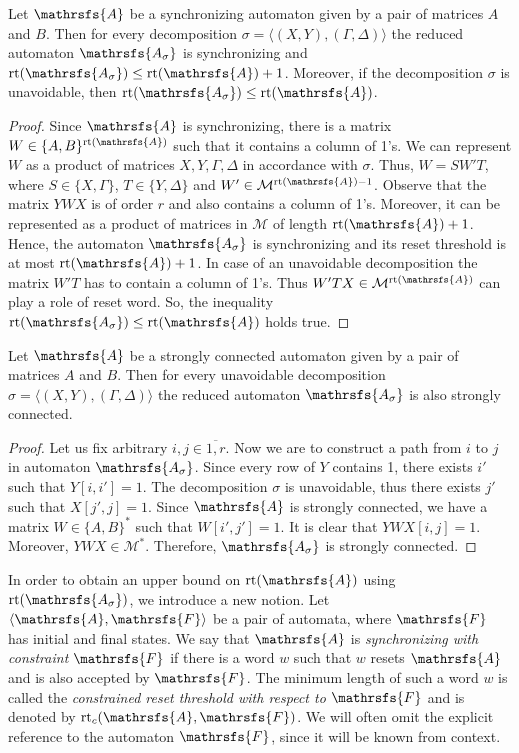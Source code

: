 \documentclass[11pt]{llncs}
\newcommand{\A}{\mathrsfs{A}}
\newcommand{\AD}{\mathrsfs{A_{\sigma}}}
\newcommand{\G}{\Gamma}
\newcommand{\D}{\Delta}
\newcommand{\rt}{\mathrm{rt}}
\newcommand{\rtc}{\mathrm{rt}_{c}}
\begin{document}
\begin{proposition}
\label{th:1} Let $\A$ be a synchronizing automaton given by a pair of matrices $A$ and $B$. Then for every decomposition $\sigma =
\langle(X,Y), (\G,\D)\rangle$ the reduced automaton $\AD$ is synchronizing and $\rt(\AD) \leq \rt(\A) + 1$. Moreover, if the decomposition
$\sigma$ is unavoidable, then $\rt(\AD) \leq \rt(\A)$.
\end{proposition}

\begin{proof}
Since $\A$ is synchronizing, there is a matrix $W \in \{A, B\}^{\rt(\A)}$ such that it contains a column of 1's. We can represent $W$ as a
product of matrices $X,Y,\G,\D$ in accordance with $\sigma$. Thus, $W = SW'T$, where $S \in \{X,\G\}$, $T \in \{Y,\D\}$ and $W' \in
\mathcal{M}^{\rt(\A) - 1}$. Observe that the matrix $YWX$ is of order $r$ and also contains a column of 1's. Moreover, it can be
represented as a product of matrices in $\mathcal{M}$ of length $\rt(\A) + 1$. Hence, the automaton $\AD$ is synchronizing and its reset
threshold is at most $\rt(\A) + 1$. In case of an unavoidable decomposition the matrix $W'T$ has to contain a column of 1's. Thus $W'TX \in
\mathcal{M}^{\rt(\A)}$ can play a role of reset word. So, the inequality $\rt(\AD) \leq \rt(\A)$ holds true.
\end{proof}


\begin{proposition}
Let $\A$ be a strongly connected automaton given by a pair of matrices $A$ and $B$. Then for every unavoidable decomposition $\sigma =
\langle(X,Y),(\G,\D)\rangle$ the reduced automaton $\AD$ is also strongly connected.
\end{proposition}

\begin{proof}
Let us fix arbitrary $i,j \in \overline{1,r}$. Now we are to construct a path from $i$ to $j$ in automaton $\AD$. Since every row of $Y$
contains 1, there exists $i'$ such that $Y[i,i'] = 1$. The decomposition $\sigma$ is unavoidable, thus there exists $j'$ such that $X[j',j]
= 1$. Since $\A$ is strongly connected, we have a matrix $W \in \{A,B\}^*$ such that $W[i',j'] = 1$. It is clear that $YWX[i,j] = 1$.
Moreover, $YWX \in \mathcal{M}^*$. Therefore, $\AD$ is strongly connected.
\end{proof}

In order to obtain an upper bound on $\rt(\A)$ using $\rt(\AD)$, we introduce a new notion. Let $\langle \A , \mathrsfs{F} \rangle$ be a
pair of automata, where $\mathrsfs{F}$ has initial and final states. We say that $\A$ is \emph{synchronizing with constraint}
$\mathrsfs{F}$ if there is a word $w$ such that $w$ resets $\A$ and is also accepted by $\mathrsfs{F}$. The minimum length of such a word
$w$ is called the \emph{constrained reset threshold with respect to} $\mathrsfs{F}$ and is denoted by $\rtc(\A, \mathrsfs{F})$. We will
often omit the explicit reference to the automaton $\mathrsfs{F}$, since it will be known from context.
\end{document}
